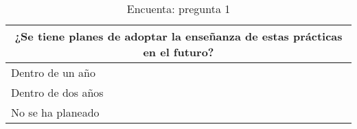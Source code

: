 \begin{table}[h!]
\begin{tabular}{ |p{12cm}||p{1cm}| }
 \toprule[1.5pt]
 \multicolumn{2}{|c|}{\textbf{¿Se tiene planes de adoptar la enseñanza de estas prácticas en el futuro?}} \\
\toprule[1.5pt]
\toprule[1.5pt]
    Dentro de un año & \\
    \hline
    Dentro de dos años & \\
    \hline
    No se ha planeado & \\
    \hline
\end{tabular}
    \caption{Encuenta: pregunta 1}
\end{table}